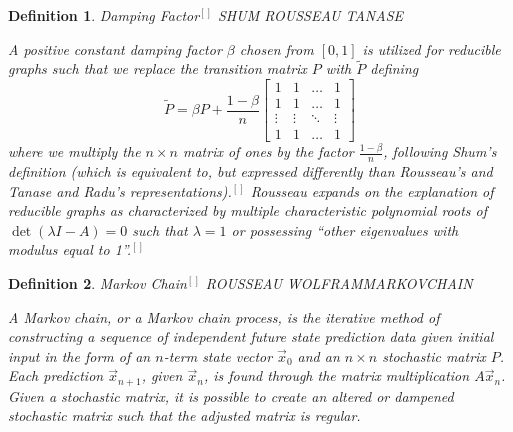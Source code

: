 \documentclass{article}
\newtheorem{definition}{Definition}
\begin{document}
    \begin{definition}{Damping Factor$^{[]}$ SHUM ROUSSEAU TANASE}
    
    \noindent
    \textup{A positive constant damping factor $\beta$ chosen from $[0,1]$ is utilized for reducible graphs such that we replace the transition matrix $P$ with $ \widetilde{P}$ defining $$\widetilde{P} = \beta P + \frac{1-\beta}{n} \begin{bmatrix} 1 & 1 & \ldots & 1 \\ 1 & 1 & \ldots & 1 \\ \vdots & \vdots & \ddots & \vdots \\ 1 & 1 & \ldots & 1 \end{bmatrix}$$ where we multiply the $n \times n$ matrix of ones by the factor $\frac{1-\beta}{n}$, following Shum's definition (which is equivalent to, but expressed differently than Rousseau's and Tanase and Radu's representations).$^{[]}$ Rousseau expands on the explanation of reducible graphs as characterized by multiple characteristic polynomial roots of $\det{(\lambda I - A)} = 0$ such that $\lambda = 1$ or possessing ``other eigenvalues with modulus equal to 1''.$^{[]}$}
    
    \end{definition}
    
    \begin{definition}{Markov Chain$^{[]}$ ROUSSEAU WOLFRAMMARKOVCHAIN}
    
    \noindent
    \textup{A Markov chain, or a Markov chain process, is the iterative method of constructing a sequence of independent future state prediction data given initial input in the form of an $n$-term state vector $\Vec{x}_0$ and an $n \times n$ stochastic matrix $P$. Each prediction $\Vec{x}_{n+1}$, given $\Vec{x}_n$, is found through the matrix multiplication $A\Vec{x}_n$. Given a stochastic matrix, it is possible to create an altered or dampened stochastic matrix such that the adjusted matrix is regular.}
    \end{definition}
    
\end{document}
